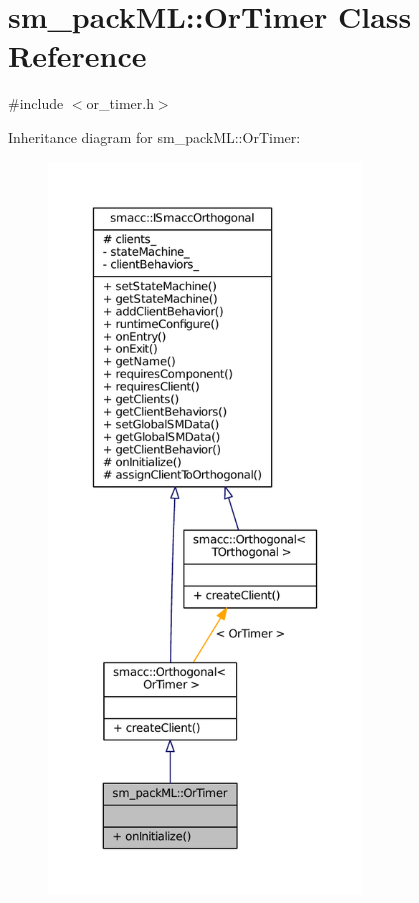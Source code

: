 \hypertarget{classsm__packML_1_1OrTimer}{}\section{sm\+\_\+pack\+ML\+:\+:Or\+Timer Class Reference}
\label{classsm__packML_1_1OrTimer}


{\ttfamily \#include $<$or\+\_\+timer.\+h$>$}



Inheritance diagram for sm\+\_\+pack\+ML\+:\+:Or\+Timer\+:
\nopagebreak
\begin{figure}[H]
\begin{center}
\leavevmode
\includegraphics[height=550pt]{classsm__packML_1_1OrTimer__inherit__graph}
\end{center}
\end{figure}


